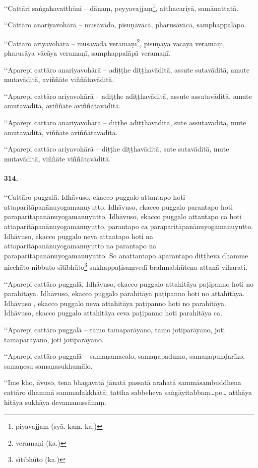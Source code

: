 ‘‘Cattāri saṅgahavatthūni – dānaṃ, peyyavajjaṃ\footnote{piyavajjaṃ (syā. kaṃ. ka.)}, atthacariyā, samānattatā.

‘‘Cattāro anariyavohārā – musāvādo, pisuṇāvācā, pharusāvācā, samphappalāpo.

‘‘Cattāro ariyavohārā – musāvādā veramaṇī\footnote{veramaṇi (ka.)}, pisuṇāya vācāya veramaṇī, pharusāya vācāya veramaṇī, samphappalāpā veramaṇī.

‘‘Aparepi cattāro anariyavohārā – adiṭṭhe diṭṭhavāditā, assute sutavāditā, amute mutavāditā, aviññāte viññātavāditā.

‘‘Aparepi cattāro ariyavohārā – adiṭṭhe adiṭṭhavāditā, assute assutavāditā, amute amutavāditā, aviññāte aviññātavāditā.

‘‘Aparepi cattāro anariyavohārā – diṭṭhe adiṭṭhavāditā, sute assutavāditā, mute amutavāditā, viññāte aviññātavāditā.

‘‘Aparepi cattāro ariyavohārā – diṭṭhe diṭṭhavāditā, sute sutavāditā, mute mutavāditā, viññāte viññātavāditā.

\paragraph{314.} ‘‘Cattāro puggalā. Idhāvuso, ekacco puggalo attantapo hoti attaparitāpanānuyogamanuyutto. Idhāvuso, ekacco puggalo parantapo hoti paraparitāpanānuyogamanuyutto. Idhāvuso, ekacco puggalo attantapo ca hoti attaparitāpanānuyogamanuyutto, parantapo ca paraparitāpanānuyogamanuyutto. Idhāvuso, ekacco puggalo neva attantapo hoti na attaparitāpanānuyogamanuyutto na parantapo na paraparitāpanānuyogamanuyutto. So anattantapo aparantapo diṭṭheva dhamme nicchāto nibbuto sītībhūto\footnote{sītibhūto (ka.)} sukhappaṭisaṃvedī brahmabhūtena attanā viharati.

‘‘Aparepi cattāro puggalā. Idhāvuso, ekacco puggalo attahitāya paṭipanno hoti no parahitāya. Idhāvuso, ekacco puggalo parahitāya paṭipanno hoti no attahitāya. Idhāvuso , ekacco puggalo neva attahitāya paṭipanno hoti no parahitāya. Idhāvuso, ekacco puggalo attahitāya ceva paṭipanno hoti parahitāya ca.

‘‘Aparepi cattāro puggalā – tamo tamaparāyano, tamo jotiparāyano, joti tamaparāyano, joti jotiparāyano.

‘‘Aparepi cattāro puggalā – samaṇamacalo, samaṇapadumo, samaṇapuṇḍarīko, samaṇesu samaṇasukhumālo.

‘‘Ime kho, āvuso, tena bhagavatā jānatā passatā arahatā sammāsambuddhena cattāro dhammā sammadakkhātā; tattha sabbeheva saṅgāyitabbaṃ…pe… atthāya hitāya sukhāya devamanussānaṃ.

